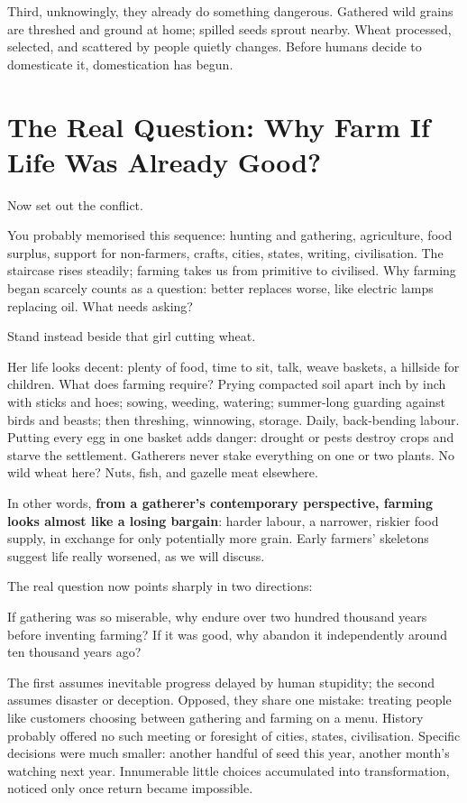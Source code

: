 Third, unknowingly, they already do something dangerous. Gathered wild grains are threshed and ground at home; spilled seeds sprout nearby. Wheat processed, selected, and scattered by people quietly changes. Before humans decide to domesticate it, domestication has begun.

\section[Why Farm If Life Was Already Good?]{The Real Question: Why Farm If Life Was Already Good?}
Now set out the conflict.

You probably memorised this sequence: hunting and gathering, agriculture, food surplus, support for non-farmers, crafts, cities, states, writing, civilisation. The staircase rises steadily; farming takes us from primitive to civilised. Why farming began scarcely counts as a question: better replaces worse, like electric lamps replacing oil. What needs asking?

Stand instead beside that girl cutting wheat.

Her life looks decent: plenty of food, time to sit, talk, weave baskets, a hillside for children. What does farming require? Prying compacted soil apart inch by inch with sticks and hoes; sowing, weeding, watering; summer-long guarding against birds and beasts; then threshing, winnowing, storage. Daily, back-bending labour. Putting every egg in one basket adds danger: drought or pests destroy crops and starve the settlement. Gatherers never stake everything on one or two plants. No wild wheat here? Nuts, fish, and gazelle meat elsewhere.

In other words, \textbf{from a gatherer's contemporary perspective, farming looks almost like a losing bargain}: harder labour, a narrower, riskier food supply, in exchange for only potentially more grain. Early farmers' skeletons suggest life really worsened, as we will discuss.

The real question now points sharply in two directions:

If gathering was so miserable, why endure over two hundred thousand years before inventing farming? If it was good, why abandon it independently around ten thousand years ago?

The first assumes inevitable progress delayed by human stupidity; the second assumes disaster or deception. Opposed, they share one mistake: treating people like customers choosing between gathering and farming on a menu. History probably offered no such meeting or foresight of cities, states, civilisation. Specific decisions were much smaller: another handful of seed this year, another month's watching next year. Innumerable little choices accumulated into transformation, noticed only once return became impossible.


